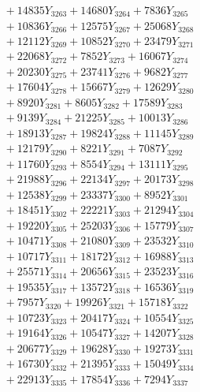 \documentclass[a4paper,10pt]{article}
\begin{document}
{\begin{align}
&\;  + 14835 Y_{3263} + 14680 Y_{3264} + 7836 Y_{3265} \\[0.3ex]
&\;  + 10836 Y_{3266} + 12575 Y_{3267} + 25068 Y_{3268} \\[0.5ex]\allowbreak
&\;  + 12112 Y_{3269} + 10852 Y_{3270} + 23479 Y_{3271} \\[0.3ex]
&\;  + 22068 Y_{3272} + 7852 Y_{3273} + 16067 Y_{3274} \\[0.3ex]
&\;  + 20230 Y_{3275} + 23741 Y_{3276} + 9682 Y_{3277} \\[0.3ex]
&\;  + 17604 Y_{3278} + 15667 Y_{3279} + 12629 Y_{3280} \\[0.3ex]
&\;  + 8920 Y_{3281} + 8605 Y_{3282} + 17589 Y_{3283} \\[0.3ex]
&\;  + 9139 Y_{3284} + 21225 Y_{3285} + 10013 Y_{3286} \\[0.3ex]
&\;  + 18913 Y_{3287} + 19824 Y_{3288} + 11145 Y_{3289} \\[0.3ex]
&\;  + 12179 Y_{3290} + 8221 Y_{3291} + 7087 Y_{3292} \\[0.3ex]
&\;  + 11760 Y_{3293} + 8554 Y_{3294} + 13111 Y_{3295} \\[0.3ex]
&\;  + 21988 Y_{3296} + 22134 Y_{3297} + 20173 Y_{3298} \\[0.5ex]\allowbreak
&\;  + 12538 Y_{3299} + 23337 Y_{3300} + 8952 Y_{3301} \\[0.3ex]
&\;  + 18451 Y_{3302} + 22221 Y_{3303} + 21294 Y_{3304} \\[0.3ex]
&\;  + 19220 Y_{3305} + 25203 Y_{3306} + 15779 Y_{3307} \\[0.3ex]
&\;  + 10471 Y_{3308} + 21080 Y_{3309} + 23532 Y_{3310} \\[0.3ex]
&\;  + 10717 Y_{3311} + 18172 Y_{3312} + 16988 Y_{3313} \\[0.3ex]
&\;  + 25571 Y_{3314} + 20656 Y_{3315} + 23523 Y_{3316} \\[0.3ex]
&\;  + 19535 Y_{3317} + 13572 Y_{3318} + 16536 Y_{3319} \\[0.3ex]
&\;  + 7957 Y_{3320} + 19926 Y_{3321} + 15718 Y_{3322} \\[0.3ex]
&\;  + 10723 Y_{3323} + 20417 Y_{3324} + 10554 Y_{3325} \\[0.3ex]
&\;  + 19164 Y_{3326} + 10547 Y_{3327} + 14207 Y_{3328} \\[0.5ex]\allowbreak
&\;  + 20677 Y_{3329} + 19628 Y_{3330} + 19273 Y_{3331} \\[0.3ex]
&\;  + 16730 Y_{3332} + 21395 Y_{3333} + 15049 Y_{3334} \\[0.3ex]
&\;  + 22913 Y_{3335} + 17854 Y_{3336} + 7294 Y_{3337} \\[0.3ex]

\end{align}}
\end{document}
